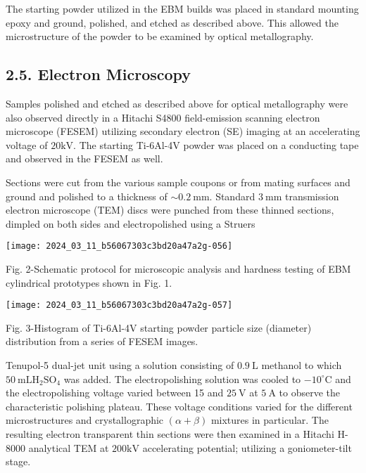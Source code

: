 \documentclass[10pt]{article}
\begin{document}
The starting powder utilized in the EBM builds was placed in standard mounting epoxy and ground, polished, and etched as described above. This allowed the microstructure of the powder to be examined by optical metallography.

\subsection*{2.5. Electron Microscopy}
Samples polished and etched as described above for optical metallography were also observed directly in a Hitachi S4800 field-emission scanning electron microscope (FESEM) utilizing secondary electron (SE) imaging at an accelerating voltage of $20 \mathrm{kV}$. The starting Ti-6Al-4V powder was placed on a conducting tape and observed in the FESEM as well.

Sections were cut from the various sample coupons or from mating surfaces and ground and polished to a thickness of $\sim 0.2 \mathrm{~mm}$. Standard $3 \mathrm{~mm}$ transmission electron microscope (TEM) discs were punched from these thinned sections, dimpled on both sides and electropolished using a Struers

\begin{center}
\texttt{[image: 2024\_03\_11\_b56067303c3bd20a47a2g-056]}
\end{center}

Fig. 2-Schematic protocol for microscopic analysis and hardness testing of EBM cylindrical prototypes shown in Fig. 1.

\begin{center}
\texttt{[image: 2024\_03\_11\_b56067303c3bd20a47a2g-057]}
\end{center}

Fig. 3-Histogram of Ti-6Al-4V starting powder particle size (diameter) distribution from a series of FESEM images.

Tenupol-5 dual-jet unit using a solution consisting of $0.9 \mathrm{~L}$ methanol to which $50 \mathrm{~mL} \mathrm{H}_{2} \mathrm{SO}_{4}$ was added. The electropolishing solution was cooled to $-10^{\circ} \mathrm{C}$ and the electropolishing voltage varied between 15 and $25 \mathrm{~V}$ at $5 \mathrm{~A}$ to observe the characteristic polishing plateau. These voltage conditions varied for the different microstructures and crystallographic $(\alpha+\beta)$ mixtures in particular. The resulting electron transparent thin sections were then examined in a Hitachi H-8000 analytical TEM at $200 \mathrm{kV}$ accelerating potential; utilizing a goniometer-tilt stage.
\end{document}

